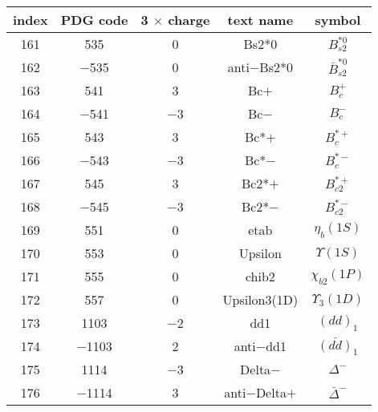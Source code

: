 \documentclass{article}
\begin{document}
\clearpage

\begin{table}[!htbp]
\centering
\begin{tabular}{|c|c|c|c|c|}
\hline
index & PDG code & 3 $\times$ charge & text name & symbol \\
\hline
161 & 535 & 0 & B\underline{\hspace{0.6em}}s2*0 & $B_{s2}^{*0}$ \\
\hline
162 & $-$535 & 0 & anti$-$B\underline{\hspace{0.6em}}s2*0 & $\bar{B}_{s2}^{*0}$ \\
\hline
163 & 541 & 3 & B\underline{\hspace{0.6em}}c$+$ & $B_{c}^{+}$ \\
\hline
164 & $-$541 & $-$3 & B\underline{\hspace{0.6em}}c$-$ & $B_{c}^{-}$ \\
\hline
165 & 543 & 3 & B\underline{\hspace{0.6em}}c*$+$ & $B_{c}^{*+}$ \\
\hline
166 & $-$543 & $-$3 & B\underline{\hspace{0.6em}}c*$-$ & $B_{c}^{*-}$ \\
\hline
167 & 545 & 3 & B\underline{\hspace{0.6em}}c2*$+$ & $B_{c2}^{*+}$ \\
\hline
168 & $-$545 & $-$3 & B\underline{\hspace{0.6em}}c2*$-$ & $B_{c2}^{*-}$ \\
\hline
169 & 551 & 0 & eta\underline{\hspace{0.6em}}b & $\eta_{b}(1S)$ \\
\hline
170 & 553 & 0 & Upsilon & $\Upsilon(1S)$ \\
\hline
171 & 555 & 0 & chi\underline{\hspace{0.6em}}b2 & $\chi_{b2}(1P)$ \\
\hline
172 & 557 & 0 & Upsilon\underline{\hspace{0.6em}}3(1D) & $\Upsilon_{3}(1D)$ \\
\hline
173 & 1103 & $-$2 & dd\underline{\hspace{0.6em}}1 & $(dd)_{1}$ \\
\hline
174 & $-$1103 & 2 & anti$-$dd\underline{\hspace{0.6em}}1 & $\bar{(dd)}_{1}$ \\
\hline
175 & 1114 & $-$3 & Delta$-$ & $\Delta^{-}$ \\
\hline
176 & $-$1114 & 3 & anti$-$Delta$+$ & $\bar{\Delta}^{-}$ \\

\end{tabular}
\end{table}
\end{document}
